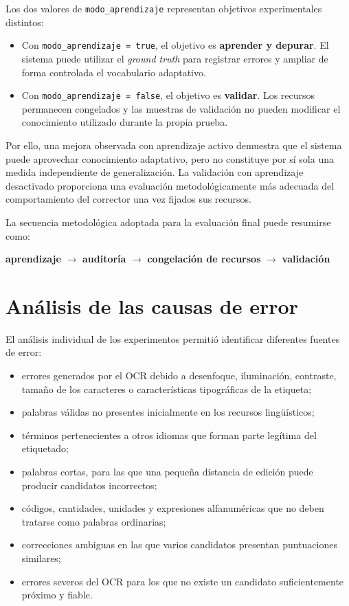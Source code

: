 Los dos valores de \texttt{modo\_aprendizaje} representan objetivos experimentales distintos:

\begin{itemize}
	\item Con \texttt{modo\_aprendizaje = true}, el objetivo es \textbf{aprender y depurar}. El sistema puede utilizar el \textit{ground truth} para registrar errores y ampliar de forma controlada el vocabulario adaptativo.
	\item Con \texttt{modo\_aprendizaje = false}, el objetivo es \textbf{validar}. Los recursos permanecen congelados y las muestras de validación no pueden modificar el conocimiento utilizado durante la propia prueba.
\end{itemize}

Por ello, una mejora observada con aprendizaje activo demuestra que el sistema puede aprovechar conocimiento adaptativo, pero no constituye por sí sola una medida independiente de generalización. La validación con aprendizaje desactivado proporciona una evaluación metodológicamente más adecuada del comportamiento del corrector una vez fijados sus recursos.

La secuencia metodológica adoptada para la evaluación final puede resumirse como:

\begin{center}
	\textbf{aprendizaje} $\rightarrow$ \textbf{auditoría} $\rightarrow$ \textbf{congelación de recursos} $\rightarrow$ \textbf{validación}
\end{center}

\section{Análisis de las causas de error}

El análisis individual de los experimentos permitió identificar diferentes fuentes de error:

\begin{itemize}[noitemsep]
	\item errores generados por el OCR debido a desenfoque, iluminación, contraste, tamaño de los caracteres o características tipográficas de la etiqueta;
	\item palabras válidas no presentes inicialmente en los recursos lingüísticos;
	\item términos pertenecientes a otros idiomas que forman parte legítima del etiquetado;
	\item palabras cortas, para las que una pequeña distancia de edición puede producir candidatos incorrectos;
	\item códigos, cantidades, unidades y expresiones alfanuméricas que no deben tratarse como palabras ordinarias;
	\item correcciones ambiguas en las que varios candidatos presentan puntuaciones similares;
	\item errores severos del OCR para los que no existe un candidato suficientemente próximo y fiable.
\end{itemize}

